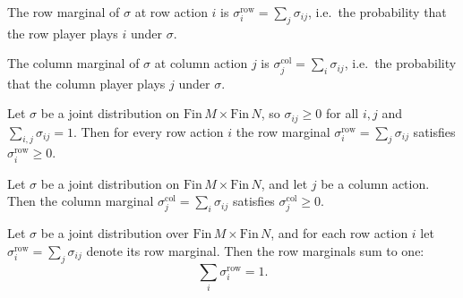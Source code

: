 \begin{definition}
\label{JointDistribution.rowMarginal}
\leanok
{}
The row marginal of $\sigma$ at row action $i$ is
$\sigma^{\mathrm{row}}_i = \sum_{j} \sigma_{ij}$,
i.e.\ the probability that the row player plays $i$ under $\sigma$.
\end{definition}

\begin{definition}
\label{JointDistribution.colMarginal}
\leanok
{}
The column marginal of $\sigma$ at column action $j$ is
$\sigma^{\mathrm{col}}_j = \sum_{i} \sigma_{ij}$,
i.e.\ the probability that the column player plays $j$ under $\sigma$.
\end{definition}

\begin{lemma}
\label{JointDistribution.rowMarginal_nonneg}
\leanok
{}
Let $\sigma$ be a joint distribution on $\mathrm{Fin}\,M \times \mathrm{Fin}\,N$, so
$\sigma_{ij} \ge 0$ for all $i,j$ and $\sum_{i,j} \sigma_{ij} = 1$. Then for every row
action $i$ the row marginal $\sigma^{\mathrm{row}}_i = \sum_{j} \sigma_{ij}$ satisfies
$\sigma^{\mathrm{row}}_i \ge 0$.
\end{lemma}

\begin{lemma}
\label{JointDistribution.colMarginal_nonneg}
\leanok
{}
Let $\sigma$ be a joint distribution on $\mathrm{Fin}\,M \times \mathrm{Fin}\,N$, and
let $j$ be a column action. Then the column marginal $\sigma^{\mathrm{col}}_j = \sum_{i}
\sigma_{ij}$ satisfies $\sigma^{\mathrm{col}}_j \ge 0$.
\end{lemma}

\begin{lemma}
\label{JointDistribution.rowMarginal_sum_one}
\leanok
{}
Let $\sigma$ be a joint distribution over $\mathrm{Fin}\,M \times \mathrm{Fin}\,N$, and
for each row action $i$ let $\sigma^{\mathrm{row}}_i = \sum_{j} \sigma_{ij}$ denote its
row marginal. Then the row marginals sum to one:
\[
\sum_{i} \sigma^{\mathrm{row}}_i = 1.
\]
\end{lemma}

